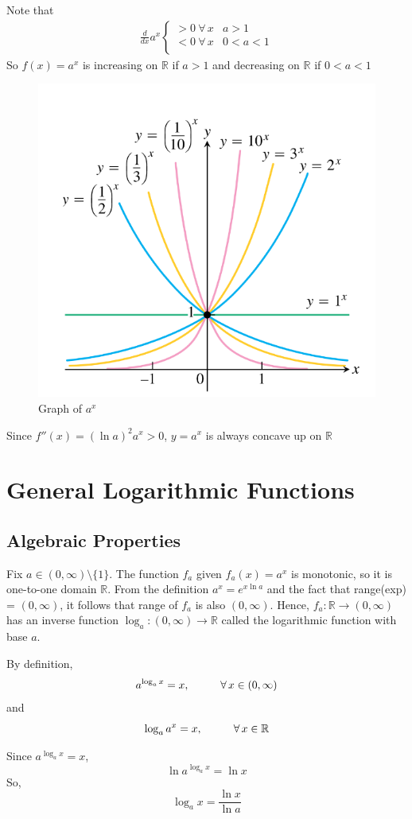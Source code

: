 \documentclass[12pt]{article}
\newcommand\tab[1][1cm]{\hspace*{#1}}
\begin{document}
Note that 
\begin{align*} 
     \frac{d}{dx} a^x 
     \begin{cases} 
        > 0 \: \forall \, x & a > 1 \\
        < 0 \: \forall \, x & 0 < a < 1 \\
     \end{cases} 
\end{align*}
So $f(x) = a^x$ is increasing on $\mathbb{R}$ if $a > 1$ and decreasing on $\mathbb{R}$ if $0 < a < 1$

\begin{figure}[H]
     \centering
     \includegraphics[width = 0.4 \linewidth]{Images/general exponential func.png}
     \caption{Graph of $a^x$}
\end{figure}

Since $f''(x) = (\ln a)^2 a^x > 0$, $y = a^x$ is always concave up on $\mathbb{R}$
\section{General Logarithmic Functions}
\subsection{Algebraic Properties}
Fix $a \in (0, \infty) \setminus\{1\}$. The function $f_a$ given $f_a(x) = a^x$ is monotonic, so it is one-to-one domain $\mathbb{R}$.
From the definition $a^x = e^{x \ln a}$ and the fact that range(exp) = $(0, \infty)$, it follows that range of $f_a$ is also $(0, \infty)$. Hence,
$f_a : \mathbb{R} \to (0, \infty)$ has an inverse function $\log_a : (0, \infty) \to \mathbb{R}$ called the logarithmic function with base $a$.

\noindent
By definition,
\[
    a^{\log_a x} = x, \textrm{\tab} \forall \, x \in (0, \infty)
\]
and
\[
    \log_a a^x = x, \textrm{\tab} \forall \, x \in \mathbb{R}
\]

Since $a^{\log_a x} = x$, 
\[
    \ln a^{\log_a x} = \ln x
\]
So, 
\[
    \log_a x = \frac{\ln x}{\ln a} 
\]
\end{document}
